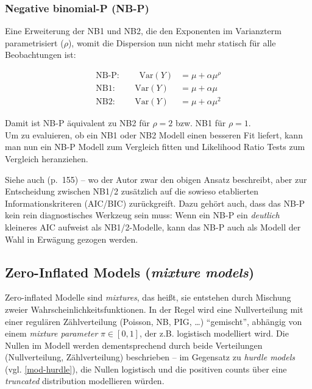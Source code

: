 \documentclass[ngerman,a4paper,]{scrartcl}
\theoremstyle{definition}
\theoremstyle{definition}
\theoremstyle{definition}
\theoremstyle{remark}
\let\BeginKnitrBlock\begin \let\EndKnitrBlock\end
\begin{document}
\hypertarget{mod-nbp}{%
\subsubsection{Negative binomial-P (NB-P)}\label{mod-nbp}}

Eine Erweiterung der NB1 und NB2, die den Exponenten im Varianzterm parametrisiert (\(\rho\)), womit die Dispersion nun nicht mehr statisch für alle Beobachtungen ist:

\BeginKnitrBlock{definition}[NB-P]
\protect\hypertarget{def:defnbp}{}{\label{def:defnbp} \iffalse (NB-P) \fi{} }\begin{align*}
  \text{NB-P: }\qquad \mathrm{Var}(Y) &= \mu + \alpha\mu^\rho \\
  \text{NB1: } \qquad \mathrm{Var}(Y) &= \mu + \alpha\mu      \\
  \text{NB2: } \qquad \mathrm{Var}(Y) &= \mu + \alpha\mu^2
\end{align*}
\EndKnitrBlock{definition}

Damit ist NB-P äquivalent zu NB2 für \(\rho = 2\) bzw. NB1 für \(\rho = 1\).\\
Um zu evaluieren, ob ein NB1 oder NB2 Modell einen besseren Fit liefert, kann man nun ein NB-P Modell zum Vergleich fitten und Likelihood Ratio Tests zum Vergleich heranziehen.

Siehe auch \citet{hilbeModelingCountData2014} (p.~155) -- wo der Autor zwar den obigen Ansatz beschreibt, aber zur Entscheidung zwischen NB1/2 zusätzlich auf die sowieso etablierten Informationskriteren (AIC/BIC) zurückgreift. Dazu gehört auch, dass das NB-P kein rein diagnostisches Werkzeug sein muss: Wenn ein NB-P ein \emph{deutlich} kleineres AIC aufweist als NB1/2-Modelle, kann das NB-P auch als Modell der Wahl in Erwägung gezogen werden.

\hypertarget{mod-zi}{%
\subsection{\texorpdfstring{Zero-Inflated Models (\emph{mixture models})}{Zero-Inflated Models (mixture models)}}\label{mod-zi}}

Zero-inflated Modelle sind \emph{mixtures}, das heißt, sie entstehen durch Mischung zweier Wahrscheinlichkeitsfunktionen. In der Regel wird eine Nullverteilung mit einer regulären Zählverteilung (Poisson, NB, PIG, \ldots{}) \enquote{gemischt}, abhängig von einem \emph{mixture parameter} \(\pi \in [0,1]\), der z.B. logistisch modelliert wird. Die Nullen im Modell werden dementsprechend durch beide Verteilungen (Nullverteilung, Zählverteilung) beschrieben -- im Gegensatz zu \emph{hurdle models} (vgl. \ref{mod-hurdle}), die Nullen logistisch und die positiven counts über eine \emph{truncated} distribution modellieren würden.
\end{document}
